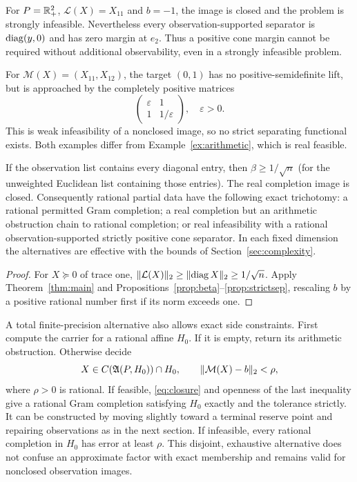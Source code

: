 \begin{example}\label{ex:weak}
For $P=\mathbb R_+^2$, $\mathcal L(X)=X_{11}$ and $b=-1$, the image is closed and the problem is strongly infeasible. Nevertheless every observation-supported separator is $\operatorname{diag}(y,0)$ and has zero margin at $e_2$. Thus a positive cone margin cannot be required without additional observability, even in a strongly infeasible problem.

For $\mathcal M(X)=(X_{11},X_{12})$, the target $(0,1)$ has no positive-semidefinite lift, but is approached by the completely positive matrices
\[
 \begin{pmatrix}\varepsilon&1\\1&1/\varepsilon\end{pmatrix},\quad\varepsilon>0.
\]
This is weak infeasibility of a nonclosed image, so no strict separating functional exists. Both examples differ from Example~\ref{ex:arithmetic}, which is real feasible.
\end{example}

\begin{corollary}\label{cor:diagonal}
If the observation list contains every diagonal entry, then $\beta\ge1/\sqrt n$ (for the unweighted Euclidean list containing those entries). The real completion image is closed. Consequently rational partial data have the following exact trichotomy: a rational permitted Gram completion; a real completion but an arithmetic obstruction chain to rational completion; or real infeasibility with a rational observation-supported strictly positive cone separator. In each fixed dimension the alternatives are effective with the bounds of Section~\ref{sec:complexity}.
\end{corollary}
\begin{proof}
For $X\succeq0$ of trace one, $\lVert \mathcal L(X)\rVert_2\ge\lVert \operatorname{diag} X\rVert_2\ge1/\sqrt n$. Apply Theorem~\ref{thm:main} and Propositions~\ref{prop:beta}--\ref{prop:strictsep}, rescaling $b$ by a positive rational number first if its norm exceeds one.
\end{proof}

A total finite-precision alternative also allows exact side constraints. First compute the carrier for a rational affine $H_0$. If it is empty, return its arithmetic obstruction. Otherwise decide
\begin{equation}\label{eq:tolerance}
 X\in C(\mathfrak A(P,H_0))\cap H_0,\qquad\lVert \mathcal M(X)-b\rVert_2<\rho,
\end{equation}
where $\rho>0$ is rational. If feasible, \eqref{eq:closure} and openness of the last inequality give a rational Gram completion satisfying $H_0$ exactly and the tolerance strictly. It can be constructed by moving slightly toward a terminal reserve point and repairing observations as in the next section. If infeasible, every rational completion in $H_0$ has error at least $\rho$. This disjoint, exhaustive alternative does not confuse an approximate factor with exact membership and remains valid for nonclosed observation images.

